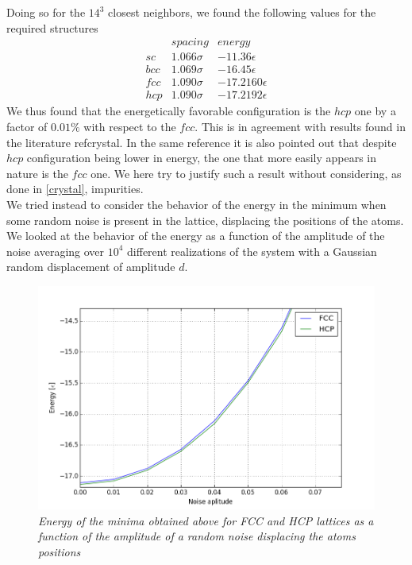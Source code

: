\documentclass[a4paper]{article}
\begin{document}
Doing so for the $14^3$ closest neighbors, we found the following values for the required structures
\begin{eqnarray*}
&spacing&energy\\
sc&1.066\sigma&-11.36\epsilon\\
bcc&1.069\sigma&-16.45\epsilon\\
fcc&1.090\sigma&-17.2160\epsilon\\
hcp&1.090\sigma&-17.2192\epsilon
\end{eqnarray*}
We thus found that the energetically favorable configuration is the $hcp$ one by a factor of $0.01\%$ with respect to the $fcc$.
This is in agreement with results found in the literature ref{crystal}. 
In the same reference it is also pointed out that despite $hcp$ configuration being lower in energy, the one that more easily appears in nature is the $fcc$ one.
We here try to justify such a result without considering, as done in \ref{crystal}, impurities.\\
We tried instead to consider the behavior of the energy in the minimum when some random noise is present in the lattice, displacing the positions of the atoms.
We looked at the behavior of the energy as a function of the amplitude of the noise averaging over $10^4$ different realizations of the system with a Gaussian random displacement of amplitude $d$.

\begin{figure}[ht]
    \centering
    \includegraphics[width=12cm]{energy_noise.png}
    \caption{\it \label{noise}Energy of the minima obtained above for FCC and HCP lattices as a function of the amplitude of a random noise displacing the atoms positions}
\end{figure}
\end{document}
